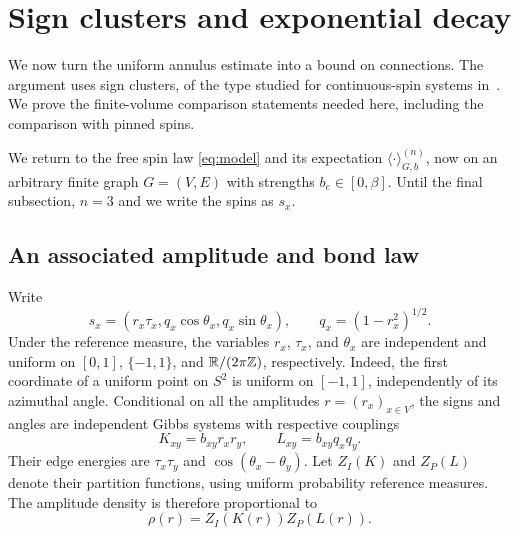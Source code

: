 \section{Sign clusters and exponential decay}\label{sec:clusters}

We now turn the uniform annulus estimate into a bound on connections.
The argument uses sign clusters, of the type studied for continuous-spin
systems in~\cite{CC}.  We prove the finite-volume comparison statements
needed here, including the comparison with pinned spins.

We return to the free spin law \eqref{eq:model} and its expectation
$\langle\cdot\rangle_{G,b}^{(n)}$, now on an arbitrary finite graph
$G=(V,E)$ with strengths $b_e\in[0,\beta]$.
Until the final subsection, $n=3$ and we write the spins as $s_x$.

\subsection{An associated amplitude and bond law}

Write
\begin{equation}\label{eq:spin-disintegration}
 s_x=(r_x\tau_x,q_x\cos\theta_x,q_x\sin\theta_x),
 \qquad q_x=(1-r_x^2)^{1/2}.
\end{equation}
Under the reference measure, the variables $r_x$, $\tau_x$, and
$\theta_x$ are independent and uniform on $[0,1]$, $\{-1,1\}$, and
$\mathbb R/(2\pi\mathbb Z)$, respectively.  Indeed, the first coordinate of a uniform
point on $S^2$ is uniform on $[-1,1]$, independently of its azimuthal
angle.  Conditional on all the amplitudes $r=(r_x)_{x\in V}$, the signs
and angles are independent Gibbs systems with respective couplings
\begin{equation}\label{eq:amplitude-couplings}
 K_{xy}=b_{xy}r_xr_y,
 \qquad L_{xy}=b_{xy}q_xq_y.
\end{equation}
Their edge energies are $\tau_x\tau_y$ and
$\cos(\theta_x-\theta_y)$.  Let $Z_I(K)$ and $Z_P(L)$ denote their
partition functions, using uniform probability reference measures.
The amplitude density is therefore proportional to
\begin{equation}\label{eq:amplitude-density}
 \rho(r)=Z_I(K(r))Z_P(L(r)).
\end{equation}

